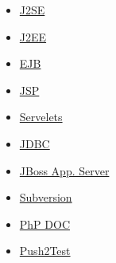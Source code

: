 \begin{itemize}
\item \href{http://java.sun.com/j2se/index.jsp}{J2SE}
\item \href{http://java.sun.com/j2ee/index.jsp}{J2EE}
\item \href{http://java.sun.com/products/ejb/}{EJB}
\item \href{http://java.sun.com/products/jsp/index.jsp}{JSP}
\item \href{http://java.sun.com/products/servlet/index.jsp}{Servelets}
\item \href{http://www.mysql.com/products/connector/j/}{JDBC}
\item \href{http://www.jboss.org/}{JBoss App. Server}
\item \href{http://subversion.tigris.org/}{Subversion}
\item \href{http://www.phpdoc.org/docs/HTMLSmartyConverter/default/phpDocumentor/tutorial_tags.pkg.html}{PhP DOC}
\item \href{http://www.pushtotest.com/}{Push2Test}
\end{itemize}




